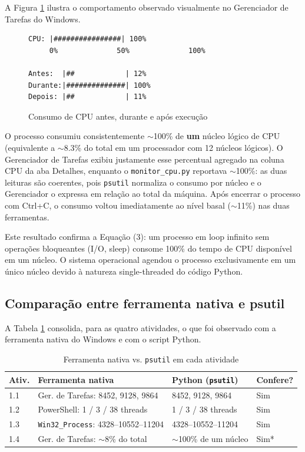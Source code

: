 \documentclass[12pt,a4paper]{article}
\begin{document}
A Figura \ref{fig:cpu} ilustra o comportamento observado visualmente no Gerenciador de Tarefas do Windows.

\begin{figure}[H]
\centering
\begin{verbatim}
CPU: |################| 100%
     0%              50%              100%

Antes:  |##            | 12%
Durante:|##############| 100%
Depois: |##            | 11%
\end{verbatim}
\caption{Consumo de CPU antes, durante e após execução}
\label{fig:cpu}
\end{figure}

O processo consumiu consistentemente $\sim$100\% de \textbf{um} núcleo lógico de CPU (equivalente a $\sim$8.3\% do total em um processador com 12 núcleos lógicos). O Gerenciador de Tarefas exibiu justamente esse percentual agregado na coluna CPU da aba Detalhes, enquanto o \texttt{monitor\_cpu.py} reportava $\sim$100\%: as duas leituras são coerentes, pois \texttt{psutil} normaliza o consumo por núcleo e o Gerenciador o expressa em relação ao total da máquina. Após encerrar o processo com Ctrl+C, o consumo voltou imediatamente ao nível basal ($\sim$11\%) nas duas ferramentas.

Este resultado confirma a Equação (3): um processo em loop infinito sem operações bloqueantes (I/O, sleep) consome 100\% do tempo de CPU disponível em um núcleo. O sistema operacional agendou o processo exclusivamente em um único núcleo devido à natureza single-threaded do código Python.

\subsection{Comparação entre ferramenta nativa e psutil}

A Tabela \ref{tab:comparacao} consolida, para as quatro atividades, o que foi observado com a ferramenta nativa do Windows e com o script Python.

\begin{table}[H]
\centering
\caption{Ferramenta nativa vs. \texttt{psutil} em cada atividade}
\label{tab:comparacao}
\begin{tabular}{@{}llll@{}}
\toprule
\textbf{Ativ.} & \textbf{Ferramenta nativa} & \textbf{Python (\texttt{psutil})} & \textbf{Confere?} \\ \midrule
1.1 & Ger. de Tarefas: 8452, 9128, 9864 & 8452, 9128, 9864 & Sim \\
1.2 & PowerShell: 1 / 3 / 38 threads & 1 / 3 / 38 threads & Sim \\
1.3 & \texttt{Win32\_Process}: 4328--10552--11204 & 4328--10552--11204 & Sim \\
1.4 & Ger. de Tarefas: $\sim$8\% do total & $\sim$100\% de um núcleo & Sim* \\ \bottomrule
\end{tabular}
\end{table}
\end{document}
